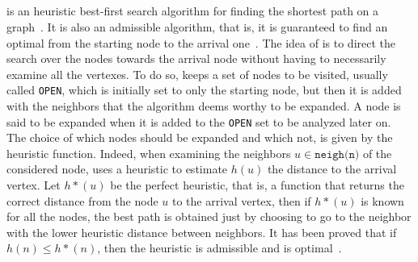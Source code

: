 \subsection{\astar}
\astar is an heuristic best-first search algorithm for finding the shortest
path on a graph~\cite{MAPF_overview}. It is also an admissible algorithm, that
is, it is guaranteed to find an optimal from the starting node to the arrival
one~\cite{astar}. \newline
The idea of \astar is to direct the search over the nodes towards the arrival
node without having to necessarily examine all the vertexes. To do so, \astar
keeps a set of nodes to be visited, usually called \texttt{OPEN}, which is
initially set to only the starting node, but then it is added with the
neighbors that the algorithm deems worthy to be expanded. A node is said to be
expanded when it is added to the \texttt{OPEN} set to be analyzed later on.
\newline
The choice of which nodes should be expanded and which not, is given by the
heuristic function. Indeed, when examining the neighbors 
$u\in \texttt{neigh(n)}$ of the considered node, \astar uses a heuristic 
to estimate $h(u)$ the distance to the arrival vertex. Let $h*(u)$ be the
perfect heuristic, that is, a function that returns the correct distance from
the node $u$ to the arrival vertex, then if $h*(u)$ is known for all the nodes,
the best path is obtained just by choosing to go to the neighbor with the lower
heuristic distance between neighbors. It has been proved that if $h(n)\leq
h*(n)$, then the heuristic is admissible and \astar is optimal~\cite{astar}.



